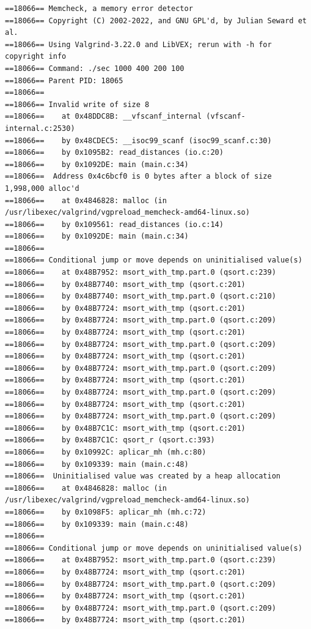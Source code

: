 \documentclass[12pt]{article}
\begin{document}
\begin{lstlisting}[style=EstiloValgrind]
==18066== Memcheck, a memory error detector
==18066== Copyright (C) 2002-2022, and GNU GPL'd, by Julian Seward et al.
==18066== Using Valgrind-3.22.0 and LibVEX; rerun with -h for copyright info
==18066== Command: ./sec 1000 400 200 100
==18066== Parent PID: 18065
==18066== 
==18066== Invalid write of size 8
==18066==    at 0x48DDC8B: __vfscanf_internal (vfscanf-internal.c:2530)
==18066==    by 0x48CDEC5: __isoc99_scanf (isoc99_scanf.c:30)
==18066==    by 0x1095B2: read_distances (io.c:20)
==18066==    by 0x1092DE: main (main.c:34)
==18066==  Address 0x4c6bcf0 is 0 bytes after a block of size 1,998,000 alloc'd
==18066==    at 0x4846828: malloc (in /usr/libexec/valgrind/vgpreload_memcheck-amd64-linux.so)
==18066==    by 0x109561: read_distances (io.c:14)
==18066==    by 0x1092DE: main (main.c:34)
==18066== 
==18066== Conditional jump or move depends on uninitialised value(s)
==18066==    at 0x48B7952: msort_with_tmp.part.0 (qsort.c:239)
==18066==    by 0x48B7740: msort_with_tmp (qsort.c:201)
==18066==    by 0x48B7740: msort_with_tmp.part.0 (qsort.c:210)
==18066==    by 0x48B7724: msort_with_tmp (qsort.c:201)
==18066==    by 0x48B7724: msort_with_tmp.part.0 (qsort.c:209)
==18066==    by 0x48B7724: msort_with_tmp (qsort.c:201)
==18066==    by 0x48B7724: msort_with_tmp.part.0 (qsort.c:209)
==18066==    by 0x48B7724: msort_with_tmp (qsort.c:201)
==18066==    by 0x48B7724: msort_with_tmp.part.0 (qsort.c:209)
==18066==    by 0x48B7724: msort_with_tmp (qsort.c:201)
==18066==    by 0x48B7724: msort_with_tmp.part.0 (qsort.c:209)
==18066==    by 0x48B7724: msort_with_tmp (qsort.c:201)
==18066==    by 0x48B7724: msort_with_tmp.part.0 (qsort.c:209)
==18066==    by 0x48B7C1C: msort_with_tmp (qsort.c:201)
==18066==    by 0x48B7C1C: qsort_r (qsort.c:393)
==18066==    by 0x10992C: aplicar_mh (mh.c:80)
==18066==    by 0x109339: main (main.c:48)
==18066==  Uninitialised value was created by a heap allocation
==18066==    at 0x4846828: malloc (in /usr/libexec/valgrind/vgpreload_memcheck-amd64-linux.so)
==18066==    by 0x1098F5: aplicar_mh (mh.c:72)
==18066==    by 0x109339: main (main.c:48)
==18066== 
==18066== Conditional jump or move depends on uninitialised value(s)
==18066==    at 0x48B7952: msort_with_tmp.part.0 (qsort.c:239)
==18066==    by 0x48B7724: msort_with_tmp (qsort.c:201)
==18066==    by 0x48B7724: msort_with_tmp.part.0 (qsort.c:209)
==18066==    by 0x48B7724: msort_with_tmp (qsort.c:201)
==18066==    by 0x48B7724: msort_with_tmp.part.0 (qsort.c:209)
==18066==    by 0x48B7724: msort_with_tmp (qsort.c:201)

\end{lstlisting}
\end{document}
